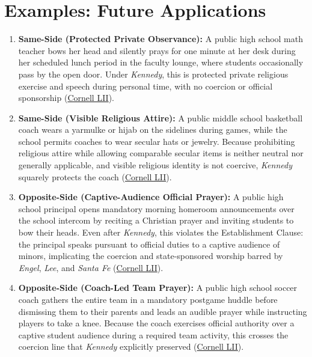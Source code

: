 \documentclass[12pt]{article}
\begin{document}
\section{Examples: Future Applications}
\begin{enumerate}
    \item \textbf{Same-Side (Protected Private Observance):} A public high school math teacher bows her head and silently prays for one minute at her desk during her scheduled lunch period in the faculty lounge, where students occasionally pass by the open door. Under \textit{Kennedy}, this is protected private religious exercise and speech during personal time, with no coercion or official sponsorship (\href{https://www.law.cornell.edu/supremecourt/text/21-418}{Cornell LII}).
    \item \textbf{Same-Side (Visible Religious Attire):} A public middle school basketball coach wears a yarmulke or hijab on the sidelines during games, while the school permits coaches to wear secular hats or jewelry. Because prohibiting religious attire while allowing comparable secular items is neither neutral nor generally applicable, and visible religious identity is not coercive, \textit{Kennedy} squarely protects the coach (\href{https://www.law.cornell.edu/supremecourt/text/21-418}{Cornell LII}).
    \item \textbf{Opposite-Side (Captive-Audience Official Prayer):} A public high school principal opens mandatory morning homeroom announcements over the school intercom by reciting a Christian prayer and inviting students to bow their heads. Even after \textit{Kennedy}, this violates the Establishment Clause: the principal speaks pursuant to official duties to a captive audience of minors, implicating the coercion and state-sponsored worship barred by \textit{Engel}, \textit{Lee}, and \textit{Santa Fe} (\href{https://www.law.cornell.edu/supremecourt/text/21-418}{Cornell LII}).
    \item \textbf{Opposite-Side (Coach-Led Team Prayer):} A public high school soccer coach gathers the entire team in a mandatory postgame huddle before dismissing them to their parents and leads an audible prayer while instructing players to take a knee. Because the coach exercises official authority over a captive student audience during a required team activity, this crosses the coercion line that \textit{Kennedy} explicitly preserved (\href{https://www.law.cornell.edu/supremecourt/text/21-418}{Cornell LII}).

\end{enumerate}
\end{document}
